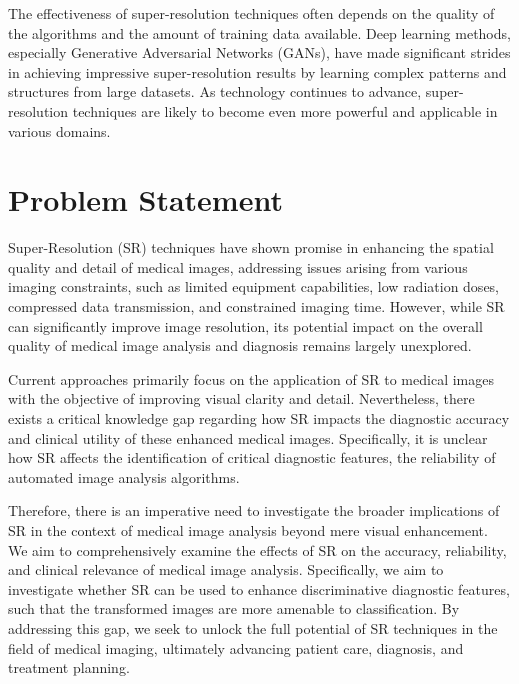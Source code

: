 \documentclass[10pt,twocolumn,letterpaper]{article}
\begin{document}
The effectiveness of super-resolution techniques often depends on the quality of the algorithms and the amount of training data available. Deep learning methods, especially Generative Adversarial Networks (GANs), have made significant strides in achieving impressive super-resolution results by learning complex patterns and structures from large datasets. As technology continues to advance, super-resolution techniques are likely to become even more powerful and applicable in various domains.

\section{Problem Statement}
\label{sec:problem}

Super-Resolution (SR) techniques have shown promise in enhancing the spatial quality and detail of medical images, addressing issues arising from various imaging constraints, such as limited equipment capabilities, low radiation doses, compressed data transmission, and constrained imaging time. However, while SR can significantly improve image resolution, its potential impact on the overall quality of medical image analysis and diagnosis remains largely unexplored.

Current approaches primarily focus on the application of SR to medical images with the objective of improving visual clarity and detail. Nevertheless, there exists a critical knowledge gap regarding how SR impacts the diagnostic accuracy and clinical utility of these enhanced medical images. Specifically, it is unclear how SR affects the identification of critical diagnostic features, the reliability of automated image analysis algorithms.

Therefore, there is an imperative need to investigate the broader implications of SR in the context of medical image analysis beyond mere visual enhancement. We aim to comprehensively examine the effects of SR on the accuracy, reliability, and clinical relevance of medical image analysis. Specifically, we aim to investigate whether SR can be used to enhance discriminative diagnostic features, such that the transformed images are more amenable to classification. By addressing this gap, we seek to unlock the full potential of SR techniques in the field of medical imaging, ultimately advancing patient care, diagnosis, and treatment planning.

\end{document}
